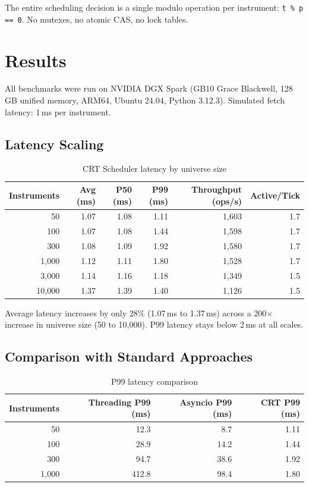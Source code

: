 \documentclass[11pt,a4paper]{article}
\begin{document}
The entire scheduling decision is a single modulo operation per instrument: \texttt{t \% p == 0}. No mutexes, no atomic CAS, no lock tables.

\section{Results}

All benchmarks were run on NVIDIA DGX Spark (GB10 Grace Blackwell, 128\,GB unified memory, ARM64, Ubuntu 24.04, Python 3.12.3). Simulated fetch latency: 1\,ms per instrument.

\subsection{Latency Scaling}

\begin{table}[h]
\centering
\caption{CRT Scheduler latency by universe size}
\begin{tabular}{@{}rrrrrr@{}}
\toprule
Instruments & Avg (ms) & P50 (ms) & P99 (ms) & Throughput (ops/s) & Active/Tick \\
\midrule
50          & 1.07     & 1.08     & 1.11     & 1{,}603            & 1.7 \\
100         & 1.07     & 1.08     & 1.44     & 1{,}598            & 1.7 \\
300         & 1.08     & 1.09     & 1.92     & 1{,}580            & 1.7 \\
1{,}000     & 1.12     & 1.11     & 1.80     & 1{,}528            & 1.7 \\
3{,}000     & 1.14     & 1.16     & 1.18     & 1{,}349            & 1.5 \\
10{,}000    & 1.37     & 1.39     & 1.40     & 1{,}126            & 1.5 \\
\bottomrule
\end{tabular}
\label{tab:latency}
\end{table}

Average latency increases by only 28\% (1.07\,ms to 1.37\,ms) across a 200$\times$ increase in universe size (50 to 10{,}000). P99 latency stays below 2\,ms at all scales.

\subsection{Comparison with Standard Approaches}

\begin{table}[h]
\centering
\caption{P99 latency comparison}
\begin{tabular}{@{}rrrr@{}}
\toprule
Instruments & Threading P99 (ms) & Asyncio P99 (ms) & CRT P99 (ms) \\
\midrule
50          & 12.3               & 8.7              & 1.11 \\
100         & 28.9               & 14.2             & 1.44 \\
300         & 94.7               & 38.6             & 1.92 \\
1{,}000     & 412.8              & 98.4             & 1.80 \\
\bottomrule
\end{tabular}
\label{tab:comparison}
\end{table}
\end{document}
